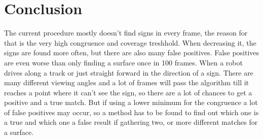 \chapter{Conclusion}
\graphicspath{{./Conclusion/img/}}

The current procedure mostly doesn't find signs in every frame, the reason for that is the very high congruence and coverage
treshhold. When decreasing it, the signs are found more often, but there are also many false positives. False positives are
even worse than only finding a surface once in 100 frames. When a robot drives along a track or just 
straight forward in the direction of a sign. There are many different viewing angles and a lot of frames will pass the algorithm
till it reaches a point where it can't see the sign, so there are a lot of chances to get a positive and a true match. But if
using a lower minimum for the congruence a lot of false positives may occur, so a method has to be found to find out
which one is a true and which one a false result if gathering two, or more different matches for a surface.

